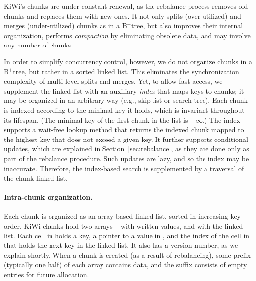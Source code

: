 KiWi's chunks are under constant renewal, as the rebalance process removes old chunks and replaces them with new ones.
It not only splits (over-utilized) and merges (under-utilized) chunks as in a B$^{+}$tree, but also improves their internal
organization, performs \emph{compaction} by eliminating obsolete data, and may involve any number of chunks.

In order to simplify concurrency control, however, we do not organize chunks in a B$^{+}$tree, but rather in a sorted linked list. This eliminates the synchronization complexity of  multi-level splits and merges.  Yet, to allow fast access, we supplement the linked list with an auxiliary \emph{index} that maps keys to chunks; it may be organized in an arbitrary way (e.g., skip-list or search tree).
Each chunk is indexed according to the minimal key it holds, which is invariant throughout its lifespan. 
(The minimal key of the first chunk in the list is $-\infty$.)
The index supports a wait-free
lookup method that returns the indexed chunk mapped to  the highest key that does not exceed a given {key}. It further supports conditional updates, which are explained in Section~\ref{sec:rebalance}, as they are done only as part of the rebalance procedure. Such updates are lazy, and so
the index may be inaccurate. Therefore, the index-based search is supplemented by a traversal of the chunk linked list.



\paragraph{Intra-chunk organization.}
Each chunk is organized as an array-based linked list, sorted in increasing key order.
KiWi chunks hold two arrays --  with written values, and  with the linked list.
Each cell in  holds a key, a pointer 
to a value in , and the index of the cell in  that holds the next key in the linked list.
It also has a version number, as we explain shortly.
When a chunk is created (as a result of rebalancing), some prefix (typically one half) of each array contains data,
and the suffix consists of empty entries for future allocation.

